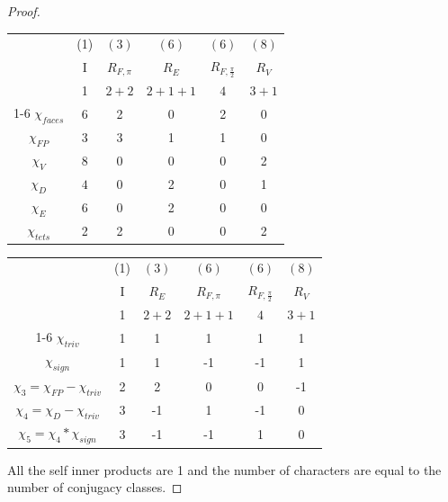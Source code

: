 \documentclass{article}
\begin{document}
\begin{proof}
    \begin{tabular}{c | c c c c c }
        & (1) & $(3)$ & $(6)$ & $(6)$ & $(8)$   \\
        & I & $R_{F, \pi}$ & $R_{E}$ & $R_{F, \frac{\pi}{2}}$ & $R_{V}$   \\
        & 1 & $2 + 2$ & $2 + 1 + 1$ & $4$ & $3 + 1$   \\
        \cline{1-6}
        $\chi_{faces}$ & 6 & 2 & 0 & 2 & 0 \\
        $\chi_{FP}$ & 3 & 3 & 1 & 1 & 0 \\
        $\chi_{V}$ & 8 & 0 & 0 & 0 & 2 \\
        $\chi_{D}$ & $4$ & 0 & 2 & 0 & 1 \\
        $\chi_{E}$ & 6 & 0 & 2 & 0 & 0 \\
        $\chi_{tets}$ & 2 & 2 & 0 & 0 & 2 
    \end{tabular}
    
    \begin{tabular}{c | c c c c c }
        & (1) & $(3)$ & $(6)$ & $(6)$ & $(8)$   \\
        & I & $R_{E}$ & $R_{F, \pi}$ & $R_{F, \frac{\pi}{2}}$ & $R_{V}$   \\
        & 1 & $2 + 2$ & $2 + 1 + 1$ & $4$ & $3 + 1$   \\
        \cline{1-6}
        $\chi_{triv}$ & 1 & 1 & 1 & 1 & 1 \\
        $\chi_{sign}$ & 1 & 1 & -1 & -1 & 1 \\
        $\chi_{3} = \chi_{FP} - \chi_{triv}$ & 2 & 2 & 0 & 0 & -1 \\
        $\chi_{4} = \chi_{D} - \chi_{triv}$ & 3 & -1 & 1 & -1 & 0 \\
        $\chi_{5} = \chi_4 * \chi_{sign}$ & 3 & -1 & -1 & 1 & 0 
    \end{tabular}

    All the self inner products are 1 and the number of characters are equal to the number of conjugacy classes.  
\end{proof}

\bigskip
\end{document}
